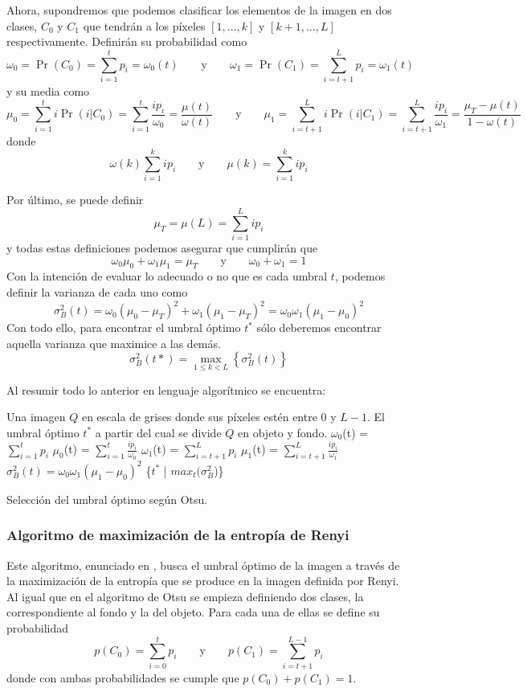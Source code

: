 Ahora, supondremos que podemos clasificar los elementos de la imagen en dos clases, $C_0$ y $C_1$ que tendrán a los píxeles $[1,\dots,k]$ y $[k+1,\dots,L]$ respectivamente. Definirán su probabilidad como
$$\omega_0 = \Pr(C_0) = \sum_{i=1}^{t}p_i=\omega_0(t)\qquad\text{y}\qquad
\omega_1 = \Pr(C_1) = \sum_{i=t+1}^{L}p_i=\omega_1(t)$$
y su media como
$$\mu_0=\sum_{i=1}^t i \Pr(i|C_0) = \sum_{i=1}^t \frac{ip_i}{\omega_0} = \frac{\mu(t)}{\omega(t)}\qquad\text{y}\qquad
\mu_1=\sum_{i=t+1}^{L} i \Pr(i|C_1) = \sum_{i=t+1}^{L} \frac{ip_i}{\omega_1} = \frac{\mu_T-\mu(t)}{1-\omega(t)}$$
donde
$$\omega(k)\sum_{i=1}^k ip_i   \qquad\text{y}\qquad   \mu(k)=\sum_{i=1}^k ip_i$$

Por último, se puede definir
$$\mu_T = \mu(L) = \sum_{i=1}^L ip_i$$
y todas estas definiciones podemos asegurar que cumplirán que
$$\omega_0\mu_0+\omega_1\mu_1 = \mu_T   \qquad\text{y}\qquad   \omega_0+\omega_1 = 1$$
Con la intención de evaluar lo adecuado o no que es cada umbral $t$, podemos definir la varianza de cada uno como 
$$\sigma_B^2(t) = \omega_0(\mu_0-\mu_T)^2 + \omega_1(\mu_1-\mu_T)^2 = \omega_0\omega_1(\mu_1-\mu_0)^2$$
Con todo ello, para encontrar el umbral óptimo $t^*$ sólo deberemos encontrar aquella varianza que maximice a las demás. 
$$\sigma_B^2(t*) = \max_{1\leq k <L}\left\{\sigma_B^2(t)\right\}$$

Al resumir todo lo anterior en lenguaje algorítmico se encuentra:

\begin{algorithm}
\begin{algorithmic}[1]
\REQUIRE Una imagen $Q$ en escala de grises donde sus píxeles estén entre $0$ y $L-1$.
\ENSURE El umbral óptimo $t^*$ a partir del cual se divide $Q$ en objeto y fondo.
\STATE $\omega_0$(t) = $\sum_{i=1}^{t}p_i$
\STATE $\mu_0$(t) = $\sum_{i=1}^t \frac{ip_i}{\omega_0}$
\STATE $\omega_1$(t) = $\sum_{i=t+1}^{L}p_i$
\STATE $\mu_1$(t) = $\sum_{i=t+1}^L \frac{ip_i}{\omega_1}$
\STATE $\sigma_B^2(t) = \omega_0\omega_1(\mu_1-\mu_0)^2$
\ENDFOR
\RETURN \{$t^*$ | $max_t(\sigma_B^2$)\}
\end{algorithmic}
\caption{Selección del umbral óptimo según Otsu.}\label{alg:otsu}
\end{algorithm}


\subsubsection{Algoritmo de maximización de la entropía de Renyi}
Este algoritmo, enunciado en \cite{art:sahoo}, busca el umbral óptimo de la imagen a través de la maximización de la entropía que se produce en la imagen definida por Renyi. Al igual que en el algoritmo de Otsu se empieza definiendo dos clases, la correspondiente al fondo y la del objeto. Para cada una de ellas se define su probabilidad
$$p(C_0)=\sum_{i=0}^{t}p_i\qquad\text{y}\qquad p(C_1)=\sum_{i=t+1}^{L-1}p_i$$
donde con ambas probabilidades se cumple que $p(C_0)+p(C_1)=1$.

